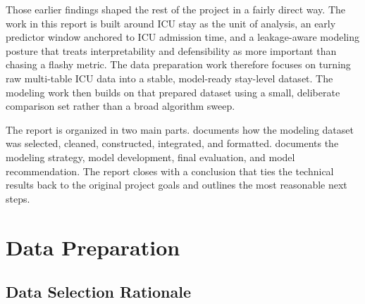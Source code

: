 \documentclass[12pt]{article}
\begin{document}
Those earlier findings shaped the rest of the project in a fairly direct way. The work in this report is built around ICU stay as the unit of analysis, an early predictor window anchored to ICU admission time, and a leakage-aware modeling posture that treats interpretability and defensibility as more important than chasing a flashy metric. The data preparation work therefore focuses on turning raw multi-table ICU data into a stable, model-ready stay-level dataset. The modeling work then builds on that prepared dataset using a small, deliberate comparison set rather than a broad algorithm sweep.

The report is organized in two main parts.  documents how the modeling dataset was selected, cleaned, constructed, integrated, and formatted.  documents the modeling strategy, model development, final evaluation, and model recommendation. The report closes with a conclusion that ties the technical results back to the original project goals and outlines the most reasonable next steps.

\newpage

\section{Data Preparation}
\label{sec:data_prep}

%

\subsection{Data Selection Rationale}
\label{subsec:data_selection}

%
%
\end{document}
